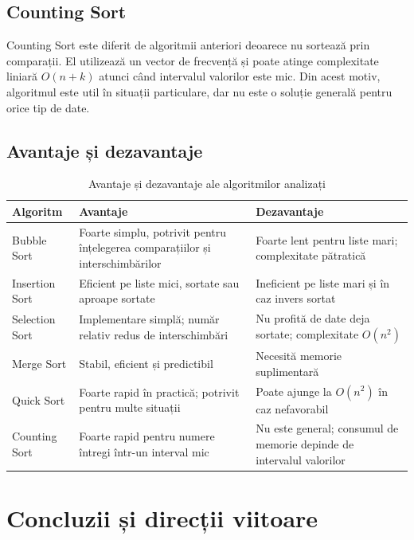 \documentclass[a4paper,12pt]{article}
\begin{document}
\subsection{Counting Sort}
Counting Sort este diferit de algoritmii anteriori deoarece nu sortează prin comparații. El utilizează un vector de frecvență și poate atinge complexitate liniară $O(n+k)$ atunci când intervalul valorilor este mic. Din acest motiv, algoritmul este util în situații particulare, dar nu este o soluție generală pentru orice tip de date.

\subsection{Avantaje și dezavantaje}

\begin{table}[H]
\centering
\caption{Avantaje și dezavantaje ale algoritmilor analizați}
\label{tab:avantaje}
\begin{tabular}{>{\raggedright\arraybackslash}p{3cm} >{\raggedright\arraybackslash}p{5.5cm} >{\raggedright\arraybackslash}p{5.5cm}}
\toprule
\textbf{Algoritm} & \textbf{Avantaje} & \textbf{Dezavantaje} \\
\midrule
Bubble Sort & Foarte simplu, potrivit pentru înțelegerea comparațiilor și interschimbărilor & Foarte lent pentru liste mari; complexitate pătratică \\
Insertion Sort & Eficient pe liste mici, sortate sau aproape sortate & Ineficient pe liste mari și în caz invers sortat \\
Selection Sort & Implementare simplă; număr relativ redus de interschimbări & Nu profită de date deja sortate; complexitate $O(n^2)$ \\
Merge Sort & Stabil, eficient și predictibil & Necesită memorie suplimentară \\
Quick Sort & Foarte rapid în practică; potrivit pentru multe situații & Poate ajunge la $O(n^2)$ în caz nefavorabil \\
Counting Sort & Foarte rapid pentru numere întregi într-un interval mic & Nu este general; consumul de memorie depinde de intervalul valorilor \\
\bottomrule
\end{tabular}
\end{table}

\section{Concluzii și direcții viitoare}
\end{document}
